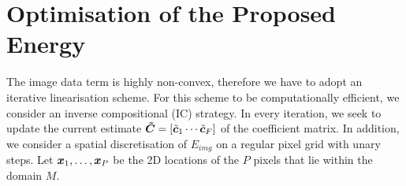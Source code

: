 \section{Optimisation of the Proposed Energy}
The image data term is highly non-convex, therefore we have to adopt an iterative
linearisation scheme. For this scheme to be computationally efficient, we consider
an inverse compositional (IC) strategy. In every iteration, we seek to update the
current estimate $\boldsymbol{\tilde{C}}= [\tilde{\boldsymbol{c}}_1 \cdots \tilde{\boldsymbol{c}}_F]$ of the
coefficient matrix. In addition, we consider a spatial discretisation of $E_{img}$ 
on a regular pixel grid with unary steps. Let $\boldsymbol{x}_1,\ldots,\boldsymbol{x}_P$ be the 2D 
locations of the $P$ pixels that lie within the domain $M$.

